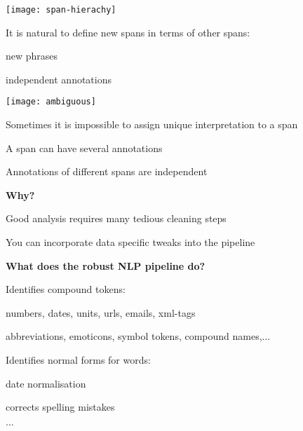 \documentclass[landscape,footrule]{foils}
\begin{document}

\centerline{\texttt{[image: span-hierachy]}}

It is natural to define new spans in terms of other spans:
\begin{diamonds}
\item new phrases 
\item independent annotations
\end{diamonds}


\centerline{\texttt{[image: ambiguous]}}

Sometimes it is impossible to assign unique interpretation to a span
\begin{diamonds}
\item A span can have several annotations
\item Annotations of different spans are independent
\end{diamonds}


\textbf{Why?}
\begin{triangles}
\item Good analysis requires many tedious cleaning steps 
\item You can incorporate data specific tweaks into the pipeline\vspace*{1cm}
\end{triangles}


\textbf{What does the robust NLP pipeline do?}
\begin{triangles}
\item Identifies compound tokens:\vspace*{0.5ex}
\begin{diamonds}
\item numbers, dates, units, urls, emails, xml-tags 
\item abbreviations, emoticons, symbol tokens, compound names,$\ldots$\vspace{1ex}
\end{diamonds}
\item Identifies normal forms for words:\vspace*{0.5ex}
\begin{diamonds}
\item date normalisation
\item \textcolor{red!90!black!100}{corrects spelling mistakes}\vspace{1ex}
\end{diamonds}
\item $\ldots$
\end{triangles}
\end{document}
